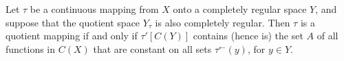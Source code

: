 Let $\tau$ be a continuous mapping from $X$ onto a completely regular space $Y$, and suppose that the quotient space $Y_{\tau}$ is also completely regular. Then $\tau$ is a quotient mapping if and only if $\tau'[C(Y)]$ contains (hence is) the set $A$ of all functions in $C(X)$ that are constant on all sets $\tau^{\leftarrow}(y)$, for $y \in Y$.
